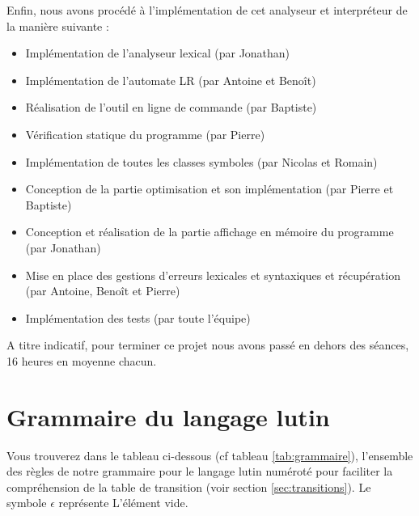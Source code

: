 Enfin, nous avons procédé à l'implémentation de cet analyseur et interpréteur de la manière suivante :
\begin{itemize}
	\item Implémentation de l'analyseur lexical (par Jonathan)
	\item Implémentation de l'automate LR (par Antoine et Benoît)
	\item Réalisation de l'outil en ligne de commande (par Baptiste)
	\item Vérification statique du programme (par Pierre)
	\item Implémentation de toutes les classes symboles (par Nicolas et Romain)
	\item Conception de la partie optimisation et son implémentation (par Pierre et Baptiste)
	\item Conception et réalisation de la partie affichage en mémoire du programme (par Jonathan)
	\item Mise en place des gestions d'erreurs lexicales et syntaxiques et récupération (par Antoine, Benoît et Pierre)
	\item Implémentation des tests (par toute l'équipe)\\
\end{itemize}

A titre indicatif, pour terminer ce projet nous avons passé en dehors des séances, 16 heures en moyenne chacun.

\newpage

\section{Grammaire du langage lutin}
\label{sec:grammaire}

Vous trouverez dans le tableau ci-dessous (cf tableau \ref{tab:grammaire}), l'ensemble des règles de notre grammaire pour le langage lutin numéroté pour faciliter la compréhension de la table de transition (voir section \ref{sec:transitions}). Le symbole $\epsilon$ représente L’élément vide.


